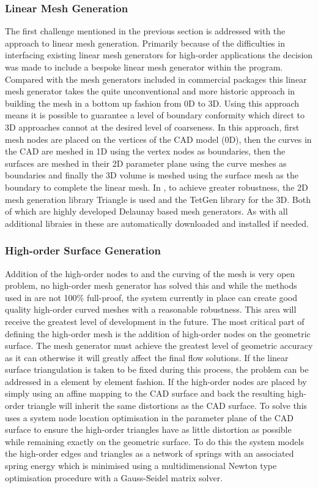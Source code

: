\subsubsection{Linear Mesh Generation}

The first challenge mentioned in the previous section is addressed with the
\nm approach to linear mesh generation. Primarily because of the
difficulties in interfacing existing linear mesh generators for high-order
applications the decision was made to include a bespoke linear mesh generator
within the program. Compared with the mesh generators included in commercial
packages this linear mesh generator takes the quite unconventional and more
historic approach in building the mesh in a bottom up fashion from 0D to 3D.
Using this approach means it is possible to guarantee a level of boundary
conformity which direct to 3D approaches cannot at the desired level of
coarseness. In this approach, first mesh nodes are placed on the vertices of
the CAD model (0D), then the curves in the CAD are meshed in 1D using the
vertex nodes as boundaries, then the surfaces are meshed in their 2D parameter
plane using the curve meshes as boundaries and finally the 3D volume is meshed
using the surface mesh as the boundary to complete the linear mesh. In \nm, to
achieve greater robustness, the 2D mesh generation library Triangle is used and
the TetGen library for the 3D. Both of which are highly developed Delaunay based
mesh generators. As with all additional libraies in \nekpp these are
automatically downloaded and installed if needed.

\subsubsection{High-order Surface Generation}

Addition of the high-order nodes to and the curving of the mesh is very open
problem, no high-order mesh generator has solved this and while the methods
used in \nm are not 100\% full-proof, the system currently in place can create
good quality high-order curved meshes with a reasonable robustness. This area
will receive the greatest level of development in the future. The most critical
part of defining the high-order mesh is the addition of high-order nodes on the
geometric surface. The mesh generator must achieve the greatest level of
geometric accuracy as it can otherwise it will greatly affect the final flow
solutions. If the linear surface triangulation is taken to be fixed during this
process, the problem can be addressed in a element by element fashion. If the
high-order nodes are placed by simply using an affine mapping to the CAD surface
and back the resulting high-order triangle will inherit the same distortions as
the CAD surface. To solve this \nm uses a system node location optimisation in
the parameter plane of the CAD surface to ensure the high-order triangles have
as little distortion as possible while remaining exactly on the geometric
surface. To do this the system models the high-order edges and triangles as a
network of springs with an associated spring energy which is minimised using a
multidimensional Newton type optimisation procedure with a Gauss-Seidel matrix
solver.

